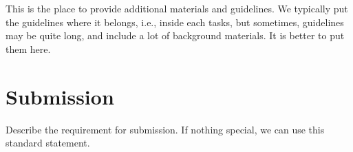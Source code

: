 This is the place to provide additional materials and guidelines. We typically 
put the guidelines where it belongs, i.e., inside each tasks, but 
sometimes, guidelines may be quite long, and include a lot of background 
materials. It is better to put them here. 



\section{Submission}

Describe the requirement for submission. If nothing special, we can
use this standard statement. 

\begin{quote}
\seedsubmission
\end{quote}






